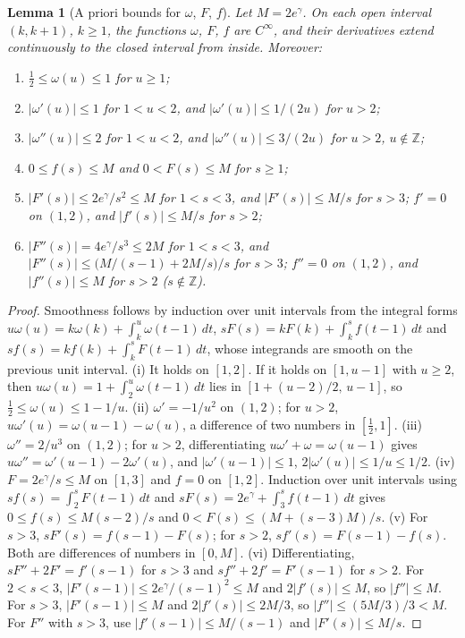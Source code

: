 \documentclass[final,11pt]{elsarticle}
\newtheorem{lemma}[theorem]{Lemma}
\theoremstyle{definition}
\theoremstyle{remark}
\numberwithin{equation}{section}
\begin{document}
\begin{lemma}[A priori bounds for $\omega$, $F$, $f$]\label{sp:lem:apriori}
Let $M=2e^\gamma$. On each open interval $(k,k+1)$, $k\ge1$, the functions
$\omega$, $F$, $f$ are $C^\infty$, and their derivatives extend continuously to
the closed interval from inside. Moreover:
\begin{enumerate}[label=(\roman*)]
\item $\tfrac12\le\omega(u)\le1$ for $u\ge1$;
\item $|\omega'(u)|\le1$ for $1<u<2$, and $|\omega'(u)|\le1/(2u)$ for $u>2$;
\item $|\omega''(u)|\le2$ for $1<u<2$, and $|\omega''(u)|\le3/(2u)$ for $u>2$,
 $u\notin\mathbb Z$;
\item $0\le f(s)\le M$ and $0<F(s)\le M$ for $s\ge1$;
\item $|F'(s)|\le2e^\gamma/s^2\le M$ for $1<s<3$, and $|F'(s)|\le M/s$ for $s>3$;
 $f'=0$ on $(1,2)$, and $|f'(s)|\le M/s$ for $s>2$;
\item $|F''(s)|=4e^\gamma/s^3\le2M$ for $1<s<3$, and
 $|F''(s)|\le\bigl(M/(s-1)+2M/s\bigr)/s$ for $s>3$; $f''=0$ on $(1,2)$, and
 $|f''(s)|\le M$ for $s>2$ ($s\notin\mathbb Z$).
\end{enumerate}
\end{lemma}

\begin{proof}
Smoothness follows by induction over unit intervals from the integral forms
$u\omega(u)=k\omega(k)+\int_k^u\omega(t-1)\,dt$,
$sF(s)=kF(k)+\int_k^sf(t-1)\,dt$ and $sf(s)=kf(k)+\int_k^sF(t-1)\,dt$, whose
integrands are smooth on the previous unit interval.
(i) It holds on $[1,2]$. If it holds on $[1,u-1]$ with $u\ge2$, then
$u\omega(u)=1+\int_2^u\omega(t-1)\,dt$ lies in $[1+(u-2)/2,\,u-1]$, so
$\tfrac12\le\omega(u)\le1-1/u$.
(ii) $\omega'=-1/u^2$ on $(1,2)$; for $u>2$, $u\omega'(u)=\omega(u-1)-\omega(u)$,
a difference of two numbers in $[\tfrac12,1]$.
(iii) $\omega''=2/u^3$ on $(1,2)$; for $u>2$, differentiating
$u\omega'+\omega=\omega(u-1)$ gives $u\omega''=\omega'(u-1)-2\omega'(u)$, and
$|\omega'(u-1)|\le1$, $2|\omega'(u)|\le1/u\le1/2$.
(iv) $F=2e^\gamma/s\le M$ on $[1,3]$ and $f=0$ on $[1,2]$. Induction over unit
intervals using $sf(s)=\int_2^sF(t-1)\,dt$ and
$sF(s)=2e^\gamma+\int_3^sf(t-1)\,dt$ gives $0\le f(s)\le M(s-2)/s$ and
$0<F(s)\le(M+(s-3)M)/s$.
(v) For $s>3$, $sF'(s)=f(s-1)-F(s)$; for $s>2$, $sf'(s)=F(s-1)-f(s)$. Both are
differences of numbers in $[0,M]$.
(vi) Differentiating, $sF''+2F'=f'(s-1)$ for $s>3$ and $sf''+2f'=F'(s-1)$ for
$s>2$. For $2<s<3$, $|F'(s-1)|\le2e^\gamma/(s-1)^2\le M$ and $2|f'(s)|\le M$,
so $|f''|\le M$. For $s>3$, $|F'(s-1)|\le M$ and $2|f'(s)|\le2M/3$, so
$|f''|\le(5M/3)/3<M$. For $F''$ with $s>3$, use $|f'(s-1)|\le M/(s-1)$ and
$|F'(s)|\le M/s$.
\end{proof}
\end{document}
